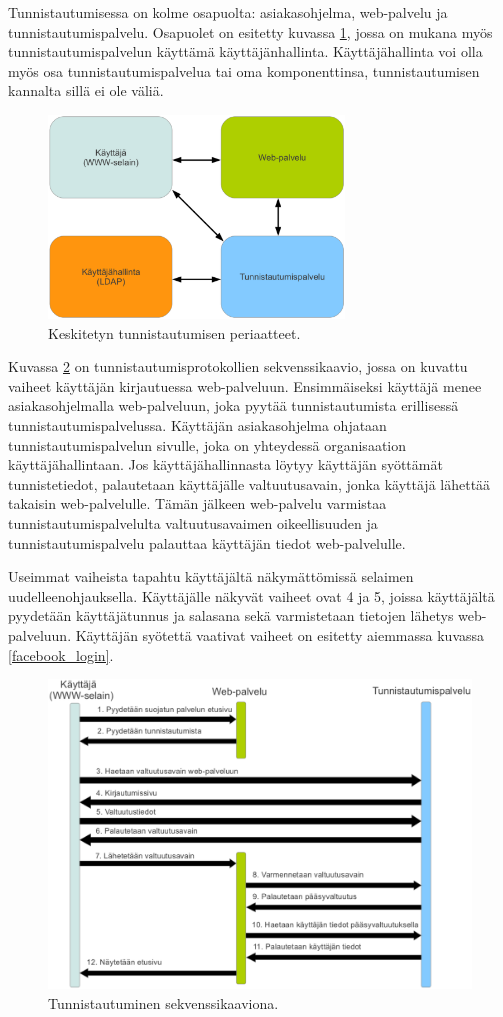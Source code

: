 Tunnistautumisessa on kolme osapuolta: asiakasohjelma, web-palvelu ja tunnistautumispalvelu. Osapuolet on esitetty kuvassa \ref{composition}, jossa on mukana myös tunnistautumispalvelun käyttämä käyttäjänhallinta. Käyttäjähallinta voi olla myös osa tunnistautumispalvelua tai oma komponenttinsa, tunnistautumisen kannalta sillä ei ole väliä.

\begin{figure}[ht]
\centering
\includegraphics[width=0.7\textwidth]{teknologiat/composition.eps}
\caption{Keskitetyn tunnistautumisen periaatteet.}%
\label{composition}
\end{figure}

Kuvassa \ref{oauth} on tunnistautumisprotokollien sekvenssikaavio, jossa on kuvattu vaiheet käyttäjän kirjautuessa web-palveluun. Ensimmäiseksi käyttäjä menee asiakasohjelmalla web-palveluun, joka pyytää tunnistautumista erillisessä tunnistautumispalvelussa. Käyttäjän asiakasohjelma ohjataan tunnistautumispalvelun sivulle, joka on yhteydessä organisaation käyttäjähallintaan. Jos käyttäjähallinnasta löytyy käyttäjän syöttämät tunnistetiedot, palautetaan käyttäjälle valtuutusavain, jonka käyttäjä lähettää takaisin web-palvelulle. Tämän jälkeen web-palvelu varmistaa tunnistautumispalvelulta valtuutusavaimen oikeellisuuden ja tunnistautumispalvelu palauttaa käyttäjän tiedot web-palvelulle.

Useimmat vaiheista tapahtu käyttäjältä näkymättömissä selaimen uudelleenohjauksella. Käyttäjälle näkyvät vaiheet ovat 4 ja 5, joissa käyttäjältä pyydetään käyttäjätunnus ja salasana sekä varmistetaan tietojen lähetys web-palveluun. Käyttäjän syötettä vaativat vaiheet on esitetty aiemmassa kuvassa \ref{facebook_login}.

\begin{figure}[ht]
\centering
\includegraphics[width=\textwidth]{teknologiat/protokollat/oauth.eps}
\caption{Tunnistautuminen sekvenssikaaviona.}%
\label{oauth}
\end{figure}